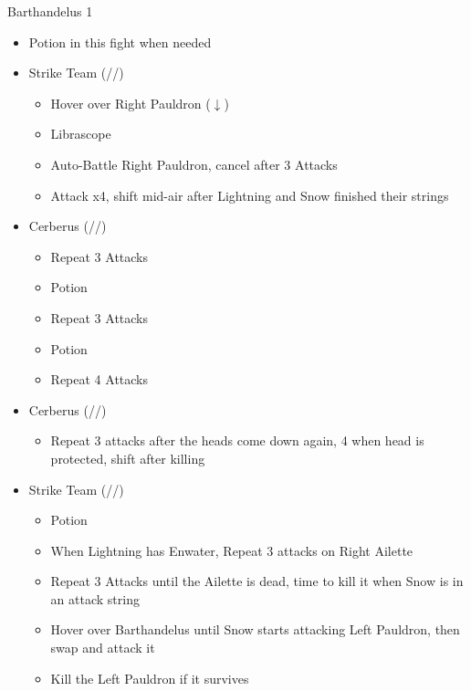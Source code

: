 \renewcommand{\first}{[1] Strike Team (\com/\syn/\com)}
\renewcommand{\second}{[2] Tri-Disaster (\rav/\rav/\rav)}
\renewcommand{\third}{[3] Tri-Disaster (\rav/\rav/\rav)}
\renewcommand{\fourth}{[4] Cerberus (\com/\com/\com)}
\renewcommand{\fifth}{[5] Cerberus (\com/\com/\com)}
\begin{battle}[2:15]{Barthandelus 1}
		\begin{itemize}
			\item Potion in this fight when needed
			\item \first
			      \begin{itemize}
				      \item Hover over Right Pauldron ($\downarrow$)
				      \item Librascope
				      \item Auto-Battle Right Pauldron, cancel after 3 Attacks
				      \item Attack x4, shift mid-air after Lightning and Snow finished their strings
			      \end{itemize}
			\item \fifth
			      \begin{itemize}
				      \item Repeat 3 Attacks
				      \item Potion
				      \item Repeat 3 Attacks
				      \item Potion
				      \item Repeat 4 Attacks
			      \end{itemize}
			\item \fourth
			      \begin{itemize}
				      \item Repeat 3 attacks after the heads come down again, 4 when head is protected, shift after killing
			      \end{itemize}
			\item \first
			      \begin{itemize}
				      \item Potion
				      \item When Lightning has Enwater, Repeat 3 attacks on Right Ailette
				      \item Repeat 3 Attacks until the Ailette is dead, time to kill it when Snow is in an attack string
				      \item Hover over Barthandelus until Snow starts attacking Left Pauldron, then swap and attack it
				      \item Kill the Left Pauldron if it survives

\end{itemize}
\end{itemize}
\end{battle}
